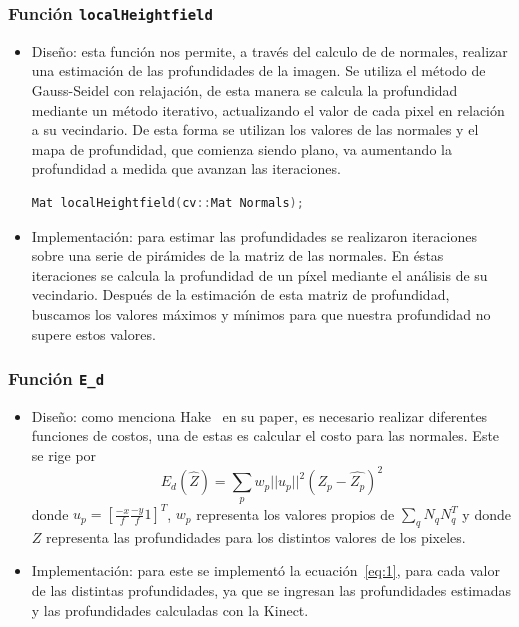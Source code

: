 \documentclass[twocolumn,11pts]{IEEEtran}
\begin{document}
\subsubsection{Función \texttt{localHeightfield}}
\begin{itemize}
\item Diseño: esta función nos permite, a través del calculo de de normales, realizar una estimación de las profundidades de la imagen. Se utiliza el método de Gauss-Seidel con relajación, de esta manera se calcula la profundidad mediante un método iterativo, actualizando el valor de cada pixel en relación a su vecindario. De esta forma se utilizan los valores de las normales y el mapa de profundidad, que comienza siendo plano, va aumentando la profundidad a medida que avanzan las iteraciones.
\begin{lstlisting}[float,language=C++,caption={Prototipo función \texttt{localHeigthfield}.},label=cod:c4]
Mat localHeightfield(cv::Mat Normals);
\end{lstlisting}
\item Implementación: para estimar las profundidades se realizaron iteraciones sobre una serie de pirámides de la matriz de las normales. En éstas iteraciones se calcula la profundidad de un píxel mediante el análisis de su vecindario. Después de la estimación de esta matriz de profundidad, buscamos los valores máximos y mínimos para que nuestra profundidad no supere estos valores.
\end{itemize}
\subsubsection{Función \texttt{E\_d}}
\begin{itemize}
\item Diseño: como menciona Hake~\cite{ourpaper} en su paper, es necesario realizar diferentes funciones de costos, una de estas es calcular el costo para las normales. Este se rige por
\begin{equation} \label{eq:1}
E_d(\hat{Z})= \sum_{p} w_p ||u_p||^{2}(Z_{p}-\hat{Z_p})^{2}
\end{equation}%
donde $u_p=[ {\frac{-x}{f}}  {\frac{-y}{f}}  1]^{T}$, $w_p$ representa los valores propios de $\sum_q N_{q}N_{q}^{T}$ y donde $Z$ representa las profundidades para los distintos valores de los pixeles.
\item Implementación: para este se implementó la ecuación~\ref{eq:1}, para cada valor de las distintas profundidades, ya que se ingresan las profundidades estimadas y las profundidades calculadas con la Kinect.
\end{itemize}
\end{document}
